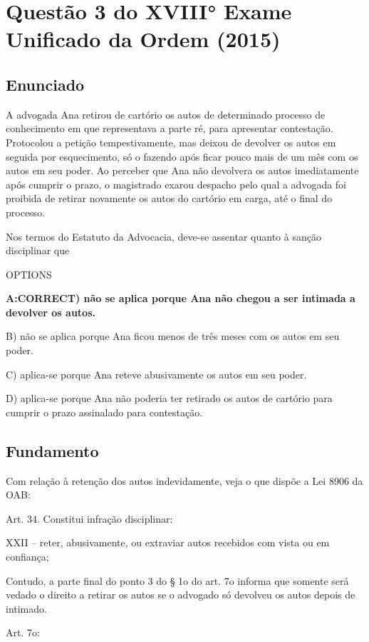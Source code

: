 \documentclass[12pt]{article}
\begin{document}
\section{Questão 3 do XVIII° Exame Unificado da Ordem (2015)}

\subsection{Enunciado}

A advogada Ana retirou de cartório os autos de determinado 
processo de conhecimento em que representava a parte ré, 
para apresentar contestação. Protocolou a petição 
tempestivamente, mas deixou de devolver os autos em 
seguida por esquecimento, só o fazendo após ficar pouco mais 
de um mês com os autos em seu poder. Ao perceber que Ana 
não devolvera os autos imediatamente após cumprir o prazo, 
o magistrado exarou despacho pelo qual a advogada foi 
proibida de retirar novamente os autos do cartório em carga, 
até o final do processo. 
 
Nos termos do Estatuto da Advocacia, deve-se assentar 
quanto à sanção disciplinar que 
 
OPTIONS

\textbf{A:CORRECT) não se aplica porque Ana não chegou a ser intimada a devolver os autos. }

B) não se aplica porque Ana ficou menos de três meses com 
os autos em seu poder. 

C) aplica-se porque Ana reteve abusivamente os autos em 
seu poder. 

D) aplica-se porque Ana não poderia ter retirado os autos de 
cartório para cumprir o prazo assinalado para contestação. 

\subsection{Fundamento}

Com relação à retenção dos autos indevidamente, veja o que dispõe a Lei 8906 da OAB:

Art. 34. Constitui infração disciplinar:

XXII – reter, abusivamente, ou extraviar autos recebidos com vista ou em confiança;

Contudo, a parte final do ponto 3 do § 1o do art. 7o informa que somente será vedado o direito a retirar os autos se o advogado só devolveu os autos depois de intimado.

Art. 7o:
\end{document}
